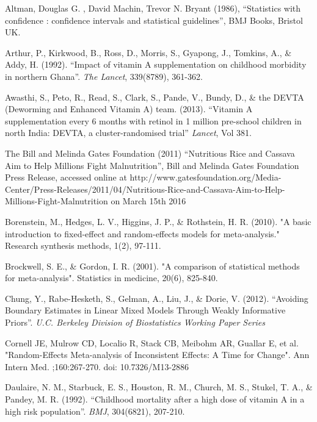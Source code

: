 \documentclass[12pt]{article}
\begin{document}
\begin{thebibliography}{99}

 Altman,  Douglas G. , David Machin, Trevor N. Bryant (1986), ``Statistics with confidence : confidence intervals and statistical guidelines'', BMJ Books, Bristol UK. 

 Arthur, P., Kirkwood, B., Ross, D., Morris, S., Gyapong, J., Tomkins, A., \& Addy, H. (1992). ``Impact of vitamin A supplementation on childhood morbidity in northern Ghana''. \emph{The Lancet}, 339(8789), 361-362.

 Awasthi, S., Peto, R., Read, S., Clark, S., Pande, V., Bundy, D., \& the DEVTA (Deworming and Enhanced Vitamin A) team. (2013). ``Vitamin A supplementation every 6 months with retinol in 1 million pre-school children in north India: DEVTA, a cluster-randomised trial'' \emph{Lancet}, Vol 381.

 The Bill and Melinda Gates Foundation (2011) ``Nutritious Rice and Cassava Aim to Help Millions Fight Malnutrition'', Bill and Melinda Gates Foundation Press Release, accessed online at http://www.gatesfoundation.org/Media-Center/Press-Releases/2011/04/Nutritious-Rice-and-Cassava-Aim-to-Help-Millions-Fight-Malnutrition on March 15th 2016 

 Borenstein, M., Hedges, L. V., Higgins, J. P., \& Rothstein, H. R. (2010). "A basic introduction to fixed-effect and random-effects models for meta-analysis." Research synthesis methods, 1(2), 97-111.

 Brockwell, S. E., \& Gordon, I. R. (2001). "A comparison of statistical methods for meta-analysis". Statistics in medicine, 20(6), 825-840.

 Chung, Y., Rabe-Hesketh, S., Gelman, A., Liu, J., \& Dorie, V. (2012). ``Avoiding Boundary Estimates in Linear Mixed Models Through Weakly Informative Priors''. \emph{U.C. Berkeley Division of Biostatistics Working Paper Series}

 Cornell JE, Mulrow CD, Localio R, Stack CB, Meibohm AR, Guallar E, et al. "Random-Effects Meta-analysis of Inconsistent Effects: A Time for Change". Ann Intern Med. ;160:267-270. doi: 10.7326/M13-2886

 Daulaire, N. M., Starbuck, E. S., Houston, R. M., Church, M. S., Stukel, T. A., \& Pandey, M. R. (1992). ``Childhood mortality after a high dose of vitamin A in a high risk population''. \emph{BMJ}, 304(6821), 207-210.


\end{thebibliography}
\end{document}
